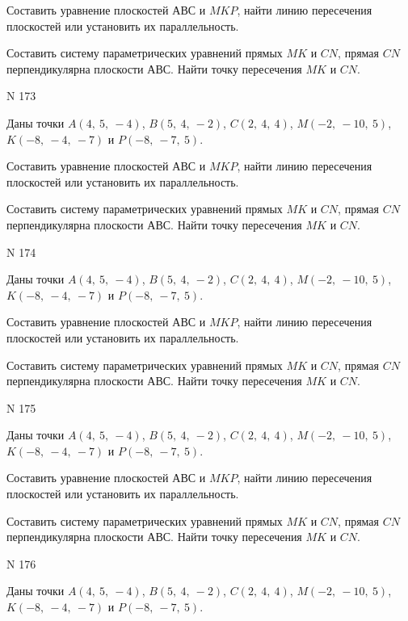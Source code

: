 \documentclass[11pt]{report}
\begin{document}
Составить уравнение плоскостей $АВС$ и $MKP$,
найти линию пересечения плоскостей или установить их параллельность.

Составить систему параметрических уравнений прямых $MK$ и $CN$,
прямая $CN$ перпендикулярна плоскости $АВС$. 
Найти точку пересечения $MK$ и $CN$.



 N 173

Даны точки $A\left( 4, \  5, \  -4\right)$, $B\left( 5, \  4, \  -2\right)$, $C\left( 2, \  4, \  4\right)$, $M\left( -2, \  -10, \  5\right)$, $K\left( -8, \  -4, \  -7\right)$ и $P\left( -8, \  -7, \  5\right)$.


Составить уравнение плоскостей $АВС$ и $MKP$,
найти линию пересечения плоскостей или установить их параллельность.

Составить систему параметрических уравнений прямых $MK$ и $CN$,
прямая $CN$ перпендикулярна плоскости $АВС$. 
Найти точку пересечения $MK$ и $CN$.



 N 174

Даны точки $A\left( 4, \  5, \  -4\right)$, $B\left( 5, \  4, \  -2\right)$, $C\left( 2, \  4, \  4\right)$, $M\left( -2, \  -10, \  5\right)$, $K\left( -8, \  -4, \  -7\right)$ и $P\left( -8, \  -7, \  5\right)$.


Составить уравнение плоскостей $АВС$ и $MKP$,
найти линию пересечения плоскостей или установить их параллельность.

Составить систему параметрических уравнений прямых $MK$ и $CN$,
прямая $CN$ перпендикулярна плоскости $АВС$. 
Найти точку пересечения $MK$ и $CN$.



 N 175

Даны точки $A\left( 4, \  5, \  -4\right)$, $B\left( 5, \  4, \  -2\right)$, $C\left( 2, \  4, \  4\right)$, $M\left( -2, \  -10, \  5\right)$, $K\left( -8, \  -4, \  -7\right)$ и $P\left( -8, \  -7, \  5\right)$.


Составить уравнение плоскостей $АВС$ и $MKP$,
найти линию пересечения плоскостей или установить их параллельность.

Составить систему параметрических уравнений прямых $MK$ и $CN$,
прямая $CN$ перпендикулярна плоскости $АВС$. 
Найти точку пересечения $MK$ и $CN$.



 N 176

Даны точки $A\left( 4, \  5, \  -4\right)$, $B\left( 5, \  4, \  -2\right)$, $C\left( 2, \  4, \  4\right)$, $M\left( -2, \  -10, \  5\right)$, $K\left( -8, \  -4, \  -7\right)$ и $P\left( -8, \  -7, \  5\right)$.
\end{document}
